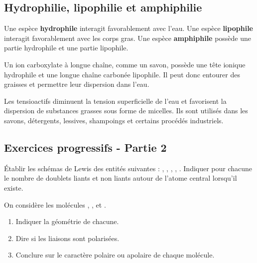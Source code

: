 \documentclass[11pt,a4paper]{article}
\begin{document}
\subsection{Hydrophilie, lipophilie et amphiphilie}

\begin{definitionbox}
Une espèce \textbf{hydrophile} interagit favorablement avec l'eau. Une espèce \textbf{lipophile} interagit favorablement avec les corps gras. Une espèce \textbf{amphiphile} possède une partie hydrophile et une partie lipophile.
\end{definitionbox}

\begin{exemplebox}
Un ion carboxylate à longue chaîne, comme un savon, possède une tête ionique hydrophile et une longue chaîne carbonée lipophile. Il peut donc entourer des graisses et permettre leur dispersion dans l'eau.
\end{exemplebox}

\begin{retenirbox}
Les tensioactifs diminuent la tension superficielle de l'eau et favorisent la dispersion de substances grasses sous forme de micelles. Ils sont utilisés dans les savons, détergents, lessives, shampoings et certains procédés industriels.
\end{retenirbox}

\subsection{Exercices progressifs - Partie 2}

\begin{exercicebox}[title=Exercice 5 - Schémas de Lewis]
Établir les schémas de Lewis des entités suivantes : , , , , . Indiquer pour chacune le nombre de doublets liants et non liants autour de l'atome central lorsqu'il existe.
\end{exercicebox}

\begin{exercicebox}[title=Exercice 6 - Polarité]
On considère les molécules , ,  et .
\begin{enumerate}
\item Indiquer la géométrie de chacune.
\item Dire si les liaisons sont polarisées.
\item Conclure sur le caractère polaire ou apolaire de chaque molécule.
\end{enumerate}
\end{exercicebox}
\end{document}
